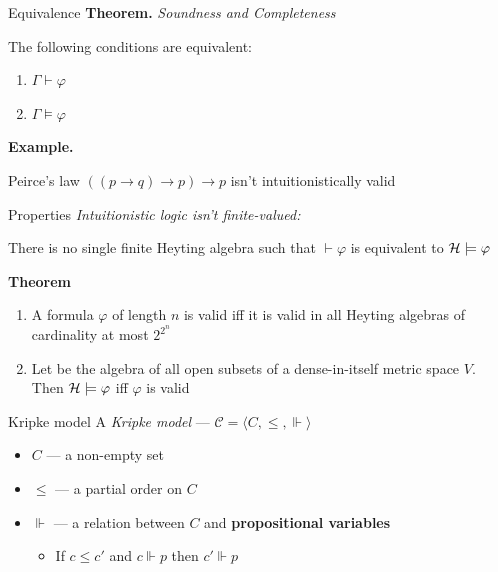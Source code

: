 \documentclass[sans]{beamer}
\begin{document}
\begin{frame}{Equivalence}
  \textbf{Theorem.} \emph{Soundness and Completeness}
  
  The following conditions are equivalent:
  \begin{enumerate}
    \item $\Gamma \vdash \varphi$
    \item $\Gamma \models \varphi$
  \end{enumerate}

  \vfill
  \pause
  \textbf{Example.}
  
  Peirce's law $((p \to q) \to p) \to p$ isn't intuitionistically valid

\end{frame}

\begin{frame}{Properties}
  \emph{Intuitionistic logic isn't finite-valued:}

  There is no single finite Heyting algebra \calh such that $\vdash \varphi$ is equivalent to
  $\mathcal{H} \models \varphi$

  \pause
  \vfill
  \textbf{Theorem}
  \begin{enumerate}
    \item A formula $\varphi$ of length $n$ is valid iff it is valid in all Heyting algebras
          of cardinality at most $2^{2^n}$
    \item Let \calh be the algebra of all open subsets of a dense-in-itself metric space $V$.
          Then $\mathcal{H} \models \varphi$ iff $\varphi$ is valid
  \end{enumerate}

\end{frame}

\begin{frame}{Kripke model}
  A \emph{Kripke model} --- $\mathcal{C} = \langle C,\leq,{\Vdash} \rangle$
  \begin{itemize}
    \item $C$ --- a non-empty set
    \item $\leq$ --- a partial order on $C$
    \item $\Vdash$ --- a relation between $C$ and \textbf{propositional variables}
    \begin{itemize}
      \item If $c \leq c'$ and $c \Vdash p$ then $c' \Vdash p$
    \end{itemize}
  \end{itemize}
\end{frame}
\end{document}
